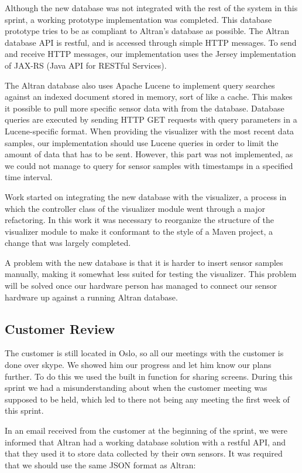 \documentclass[../document]{subfiles}
\begin{document}
Although the new database was not integrated with the rest of the system in this sprint, a working prototype implementation was completed. This database prototype tries to be as compliant to Altran’s database as possible. The Altran database API is restful, and is accessed through simple HTTP messages. To send and receive HTTP messages, our implementation uses the Jersey implementation of JAX-RS (Java API for RESTful Services).

The Altran database also uses Apache Lucene to implement query searches against an indexed document stored in memory, sort of like a cache. This makes it possible to pull more specific sensor data with from the database. Database queries are executed by sending HTTP GET requests with query parameters in a Lucene-specific format. When providing the visualizer with the most recent data samples, our implementation should use Lucene queries in order to limit the amount of data that has to be sent. However, this part was not implemented, as we could not manage to query for sensor samples with timestamps in a specified time interval.

Work started on integrating the new database with the visualizer, a process in which the controller class of the visualizer module went through a major refactoring. In this work it was necessary to reorganize the structure of the visualizer module to make it conformant to the style of a Maven project, a change that was largely completed.

A problem with the new database is that it is harder to insert sensor samples manually, making it somewhat less suited for testing the visualizer. This problem will be solved once our hardware person has managed to connect our sensor hardware up against a running Altran database.

\subsection{Customer Review}
The customer is still located in Oslo, so all our meetings with the customer is done over skype. We showed him our progress and let him know our plans further. To do this we used the built in function for sharing screens. During this sprint we had a misunderstanding about when the customer meeting was supposed to be held, which led to there not being any meeting the first week of this sprint.

In an email received from the customer at the beginning of the sprint, we were informed that Altran had a working database solution with a restful API, and that they used it to store data collected by their own sensors. It was required that we should use the same JSON format as Altran:
\end{document}
